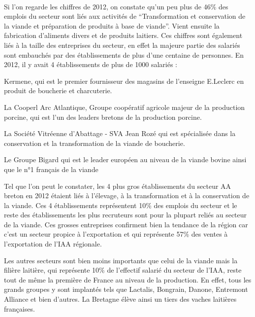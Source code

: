 \documentclass[a4paper,12pt]{report}
\begin{document}
			\paragraph{}Si l’on regarde les chiffres de 2012, on constate qu’un peu plus de 46\% des emplois du secteur sont liés aux activités de  “Transformation et conservation de la viande et préparation de produits à base de viande”. Vient ensuite la fabrication d’aliments divers et de produits laitiers. Ces chiffres sont également liés à la taille des entreprises du secteur, en effet la majeure partie des salariés sont embauchés par des établissements de plus d’une centaine de personnes. En 2012, il y avait 4 établissements de plus de 1000 salariés :
			\begin{list}{•}{}
			\item Kermene, qui est le premier fournisseur des magasins de l’enseigne E.Leclerc en produit de boucherie et charcuterie.
			\item La Cooperl Arc Atlantique, Groupe coopératif agricole majeur de la production porcine, qui est l’un des leaders bretons de la production porcine.
			\item La Société Vitréenne d’Abattage - SVA Jean Rozé qui est spécialisée dans la conservation et la transformation de la viande de boucherie.
			\item Le Groupe Bigard qui est le leader européen au niveau de la viande bovine ainsi que le n°1 français de la viande\cite{BigardPremierTransformateurViande}
			\end{list}
			
			Tel que l’on peut le constater, les 4 plus gros établissements du secteur AA breton en 2012 étaient liés à l’élevage, à la transformation et à la conservation de la viande. Ces 4 établissements représentent 10\% des emplois du secteur et le reste des établissements les plus recruteurs sont pour la plupart reliés au secteur de la viande. Ces grosses entreprises confirment bien la tendance de la région car c’est un secteur propice à l’exportation et qui représente 57\% des ventes à l’exportation de l’IAA régionale.
			
			Les autres secteurs sont bien moins importants que celui de la viande mais la filière laitière, qui représente 10\% de l’effectif salarié du secteur de l’IAA, reste tout de même la première de France au niveau de la production. En effet, tous les grands groupes y sont implantés tels que Lactalis, Bongrain, Danone, Entremont Alliance et bien d’autres\cite{ProduitsLaitiersRegionBretagne}. La Bretagne élève ainsi un tiers des vaches laitières françaises.
			
\end{document}
